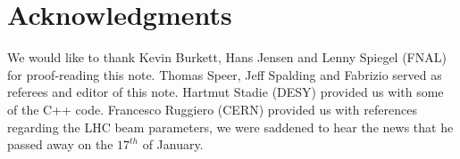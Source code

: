 \documentclass{cmspaper}
\def\pythia {\texttt{PYTHIA }}
\begin{document}
\section{\label{sect:acknowledgments}Acknowledgments}

We would like to thank Kevin Burkett, Hans Jensen and Lenny Spiegel (FNAL) 
for proof-reading this note. Thomas Speer, Jeff Spalding and Fabrizio served as referees and editor of this note. Hartmut Stadie (DESY) provided us with some of 
the C++ code. Francesco Ruggiero (CERN) provided us with references regarding the LHC beam parameters, we were saddened to hear the news that he 
passed away on the $17^{th}$ of January.


\clearpage
\end{document}
